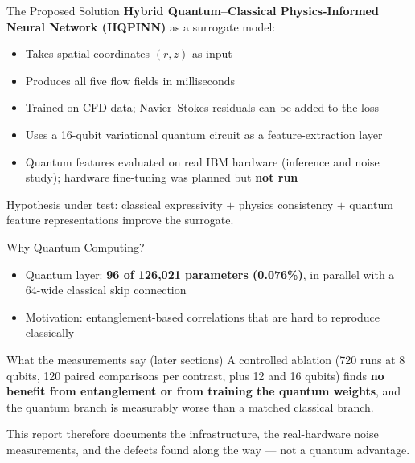 \documentclass[aspectratio=169]{beamer}
\begin{document}
\begin{frame}{The Proposed Solution}
\textbf{Hybrid Quantum--Classical Physics-Informed Neural Network (HQPINN)} as a surrogate model:

\begin{itemize}
  \item Takes spatial coordinates $(r, z)$ as input
  \item Produces all five flow fields in milliseconds
  \item Trained on CFD data; Navier--Stokes residuals can be added to the loss
  \item Uses a 16-qubit variational quantum circuit as a feature-extraction layer
  \item Quantum features evaluated on real IBM hardware (inference and noise study); hardware fine-tuning was planned but \textbf{not run}
\end{itemize}

\vspace{0.3cm}
Hypothesis under test: classical expressivity $+$ physics consistency $+$ quantum feature representations improve the surrogate.
\end{frame}

\begin{frame}{Why Quantum Computing?}
\begin{itemize}
  \item Quantum layer: \textbf{96 of 126,021 parameters (0.076\%)}, in parallel with a 64-wide classical skip connection
  \item Motivation: entanglement-based correlations that are hard to reproduce classically
\end{itemize}

\vspace{0.3cm}
\begin{alertblock}{What the measurements say (later sections)}
A controlled ablation (720 runs at 8 qubits, 120 paired comparisons per contrast, plus 12 and 16 qubits) finds \textbf{no benefit from entanglement or from training the quantum weights}, and the quantum branch is measurably worse than a matched classical branch.
\end{alertblock}

This report therefore documents the infrastructure, the real-hardware noise measurements, and the defects found along the way --- not a quantum advantage.
\end{frame}

\end{document}
